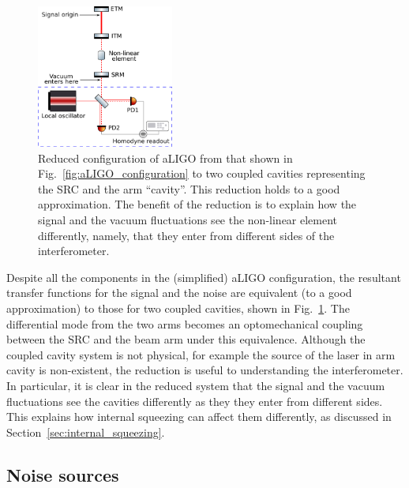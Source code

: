 \documentclass[aps,pra,superscriptaddress,reprint,nofootinbib]{revtex4-1}
\begin{document}
\begin{figure}[ht]
	\begin{center}
	\includegraphics[width=0.4\textwidth]{figures/aLIGO_as_coupled_cavities.pdf}
	\end{center}
	\caption{Reduced configuration of aLIGO from that shown in Fig.~\ref{fig:aLIGO_configuration} to two coupled cavities representing the SRC and the arm “cavity”. This reduction holds to a good approximation. The benefit of the reduction is to explain how the signal and the vacuum fluctuations see the non-linear element differently, namely, that they enter from different sides of the interferometer.}
	\label{fig:aLIGO_as_coupled_cavities}
\end{figure}

Despite all the components in the (simplified) aLIGO configuration, the resultant transfer functions for the signal and the noise are equivalent (to a good approximation) to those for two coupled cavities, shown in Fig.~\ref{fig:aLIGO_as_coupled_cavities}. The differential mode from the two arms becomes an optomechanical coupling between the SRC and the beam arm under this equivalence.
Although the coupled cavity system is not physical, for example the source of the laser in arm cavity is non-existent, the reduction is useful to understanding the interferometer. In particular, it is clear in the reduced system that the signal and the vacuum fluctuations see the cavities differently as they they enter from different sides. This explains how internal squeezing can affect them differently, as discussed in Section~\ref{sec:internal_squeezing}.


\subsection{Noise sources}
\label{sec:noise_sources}
\end{document}
